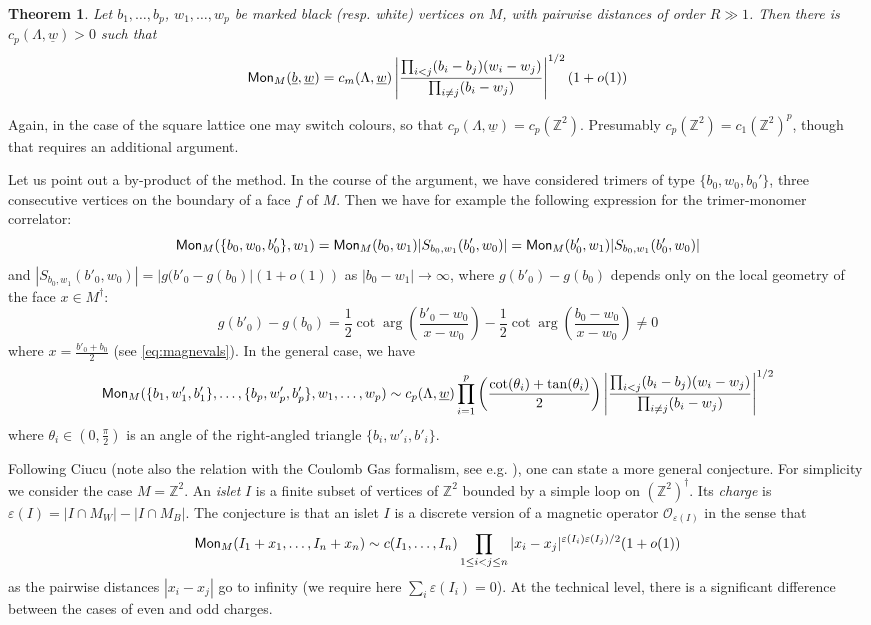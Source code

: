 \documentclass[10pt]{article}
\newcommand{\Z}{\mathbb{Z}}
\newcommand{\mc}{\mathcal}
\newcommand{\eps}{\varepsilon}
\newcommand{\dg}{\dagger}
\newcommand{\Mon}{{\sf Mon}}
\newtheorem{Thm}[thm]{Theorem}
\begin{document}
\begin{Thm}\label{Thm:FS}
Let $b_1,\dots,b_p$, $w_1,\dots,w_p$ be marked black (resp. white) vertices on $M$, with pairwise distances of order $R\gg1$. Then there is $c_p(\Lambda,\underline w)>0$ such that
$$\Mon_M(\underline b,\underline w)=c_m(\Lambda,\underline w)\left|\frac{\prod_{i<j}(b_i-b_j)(w_i-w_j)}{\prod_{i\neq j}(b_i-w_j)}\right|^{1/2}
(1+o(1))$$
\end{Thm}
Again, in the case of the square lattice one may switch colours, so that $c_p(\Lambda,\underline w)=c_p(\Z^2)$. Presumably $c_p(\Z^2)=c_1(\Z^2)^p$, though that requires an additional argument.

Let us point out a by-product of the method. In the course of the argument, we have considered trimers of type $\{b_0,w_0,b_0'\}$, three consecutive vertices on the boundary of a face $f$ of $M$. Then we have for example the following expression for the trimer-monomer correlator:
$$\Mon_M(\{b_0,w_0,b'_0\},w_1)=\Mon_M(b_0,w_1)|S_{b_0,w_1}(b'_0,w_0)|=\Mon_M(b'_0,w_1)|S_{b_0,w_1}(b'_0,w_0)|$$
and $|S_{b_0,w_1}(b'_0,w_0)|=|g(b'_0-g(b_0)|(1+o(1))$ as $|b_0-w_1|\rightarrow\infty$, where $g(b'_0)-g(b_0)$ depends only on the local geometry of the face $x\in M^\dg$:
$$g(b'_0)-g(b_0)=\frac 12\cot\arg\left(\frac{b'_0-w_0}{x-w_0}\right)-\frac 12\cot\arg\left(\frac{b_0-w_0}{x-w_0}\right)\neq 0$$
where $x=\frac{b'_0+b_0}2$ (see \eqref{eq:magnevals}). In the general case, we have
$$\Mon_M(\{b_1,w'_1,b'_1\},\dots,\{b_p,w'_p,b'_p\},w_1,\dots,w_p)\sim c_p(\Lambda,\underline w)\prod_{i=1}^p\left(\frac{\cot(\theta_i)+\tan(\theta_i)}2\right)\left|\frac{\prod_{i<j}(b_i-b_j)(w_i-w_j)}{\prod_{i\neq j}(b_i-w_j)}\right|^{1/2}$$
where $\theta_i\in(0,\frac\pi 2)$ is an angle of the right-angled triangle 
$\{b_i,w'_i,b'_i\}$.

Following Ciucu \cite{Ciucu_PNAS} (note also the relation with the Coulomb Gas formalism, see e.g. \cite{NieKno_potts,Nien_Coulomb,DiFSalZub_coulomb}), one can state a more general conjecture. For simplicity we consider the case $M=\Z^2$. An {\em islet} $I$ is a finite subset of vertices of $\Z^2$ bounded by a simple loop on $(\Z^2)^\dg$. Its {\em charge} is $\eps(I)=|I\cap M_W|-|I\cap M_B|$. The conjecture is that an islet $I$ is a discrete version of a magnetic operator ${\mc O}_{\eps(I)}$ in the sense that 
$$\Mon_M(I_1+x_1,\dots,I_n+x_n)\sim c(I_1,\dots,I_n)\prod_{1\leq i<j\leq n}|x_i-x_j|^{\eps(I_i)\eps(I_j)/2}(1+o(1))$$
as the pairwise distances $|x_i-x_j|$ go to infinity (we require here $\sum_i\eps(I_i)=0$). At the technical level, there is a significant difference between the cases of even and odd charges.
\end{document}

